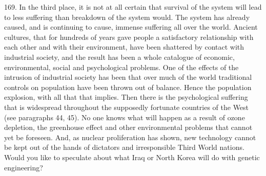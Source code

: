 \documentclass{article}
\begin{document}
169.  In the third place, it is not at all certain that survival of the system will lead to less suffering 
than breakdown of the system would.  The system has already caused, and is continuing to cause, 
immense suffering all over the world.  Ancient cultures, that for hundreds of years gave people a 
satisfactory  relationship  with  each  other  and  with  their  environment,  have  been  shattered  by  
contact with industrial society, and the result has been a whole catalogue of economic, 
environmental, social and psychological problems.  One of the effects of the intrusion of industrial 
society has been that over much of the world traditional controls on population have been thrown 
out  of  balance.   Hence  the  population  explosion,  with  all  that  that  implies.   Then  there  is  the  
psychological  suffering  that  is  widespread  throughout  the  supposedly  fortunate  countries  of  the  
West (see paragraphs 44, 45).  No one knows what will happen as a result of ozone depletion, the 
greenhouse effect and other environmental problems that cannot yet be foreseen.  And, as nuclear 
proliferation  has  shown,  new  technology  cannot  be  kept  out  of  the  hands  of  dictators  and  
irresponsible Third World nations.  Would you like to speculate about what Iraq or North Korea 
will do with genetic engineering? \vspace{\baselineskip}
\end{document}
